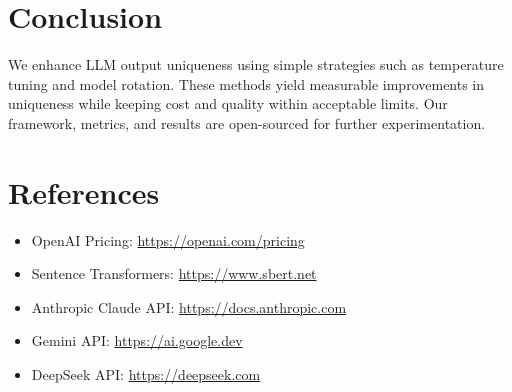 \documentclass{article}
\begin{document}
\section{Conclusion}
We enhance LLM output uniqueness using simple strategies such as temperature tuning and model rotation. These methods yield measurable improvements in uniqueness while keeping cost and quality within acceptable limits. Our framework, metrics, and results are open-sourced for further experimentation.

\section*{References}
\begin{itemize}
  \item OpenAI Pricing: \url{https://openai.com/pricing}
  \item Sentence Transformers: \url{https://www.sbert.net}
  \item Anthropic Claude API: \url{https://docs.anthropic.com}
  \item Gemini API: \url{https://ai.google.dev}
  \item DeepSeek API: \url{https://deepseek.com}
\end{itemize}
\end{document}
